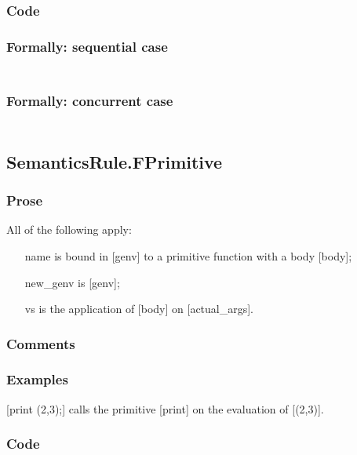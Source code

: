 \documentclass{book}
\begin{document}
  \subsubsection{Code}

  \subsubsection{Formally: sequential case}
  \begin{align}
  \end{align} 

  \subsubsection{Formally: concurrent case}
  \begin{align}
  \end{align} 

\subsection{SemanticsRule.FPrimitive \label{sec:SemanticsRule.FPrimitive}}

  \subsubsection{Prose}
  All of the following apply:
  \begin{itemize}
  \item [name] is bound in [genv] to a primitive function with a body [body];
  \item [new\_genv] is [genv];
  \item [vs] is the application of [body] on [actual\_args].
  \end{itemize}

  \subsubsection{Comments}

  \subsubsection{Examples}
  [print (2,3);] calls the primitive [print] on the evaluation of [(2,3)].

  \subsubsection{Code}
\end{document}
